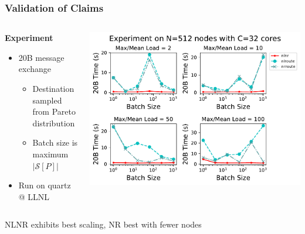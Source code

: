 \documentclass{beamer}
\begin{document}

\begin{frame}
\frametitle{Validation of Claims}


\begin{columns}
\begin{column}{0.3\textwidth}
	\textbf{Experiment}
	\begin{itemize}
		\item 20B message exchange
		\begin{itemize}
			\item Destination sampled from Pareto distribution
			\item Batch size is maximum $|\mathcal{S}[P]|$
		\end{itemize}
		\item Run on quartz @ LLNL
	\end{itemize}
\end{column}
\begin{column}{0.7\textwidth}  %
\begin{center}
	\includegraphics[width=1.0\textwidth]{512_32}
\end{center}
\end{column}

\end{columns}

\begin{block}{}
	\begin{center}
		NLNR exhibits best scaling, NR best with fewer nodes
	\end{center}
\end{block}

\end{frame}
\end{document}
